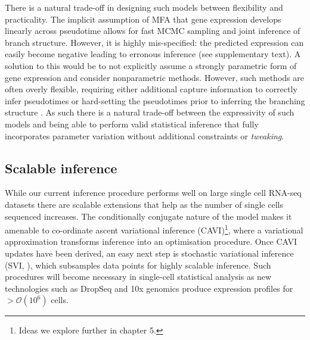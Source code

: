 There is a natural trade-off in designing such models between flexibility and practicality. The implicit assumption of MFA that gene expression develops linearly across pseudotime allows for fast MCMC sampling and joint inference of branch structure. However, it is highly mis-specified: the predicted expression can easily become negative leading to erronous inference (see supplementary text). A solution to this would be to not explicitly assume a strongly parametric form of gene expression and consider nonparametric methods. However, such methods are often overly flexible, requiring either additional capture information to correctly infer pseudotimes \cite{reid2016pseudotime} or hard-setting the pseudotimes prior to inferring the branching structure \cite{lonnberg2016temporal}. As such there is a natural trade-off between the expressivity of such models and being able to perform valid statistical inference that fully incorporates parameter variation without additional constraints or
 \emph{tweaking}.




\subsection{Scalable inference}

While our current inference procedure performs well on large single cell RNA-seq datasets there are scalable extensions that help as the number of single cells sequenced increases. The conditionally conjugate nature of the model makes it amenable to co-ordinate ascent variational inference (CAVI)\footnote{Ideas we explore further in chapter 5.}, where a variational approximation transforms inference into an optimisation procedure. Once CAVI updates have been derived, an easy next step is   stochastic variational inference (SVI, \cite{hoffman2013stochastic}), which subsamples data points for highly scalable inference. Such procedures will become necessary in single-cell statistical analysis as new technologies such as DropSeq \cite{Macosko2015-ek}
and 10x genomics \cite{eisenstein2015startups} produce expression profiles for $>\mathcal{O}(10^6)$ cells.

